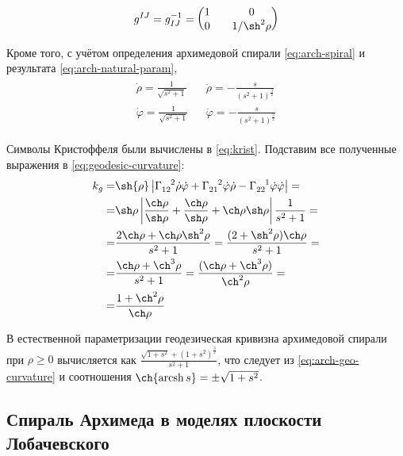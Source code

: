 \documentclass{article}
\numberwithin{equation}{section}
\renewcommand{\phi}{\varphi}
\newcommand{\krist}[3]{\Gamma^{\phantom{#1 #2}#3}_{#1 #2}}
\DeclareMathOperator{\arcsh}{arcsh}
\providecommand{\abs}[1]{\left \lvert{#1}\right \rvert}
\begin{document}
\begin{equation*}
  g^{IJ} = g_{IJ}^{-1} = \begin{pmatrix} 1 && 0 \\ 0 && 1/\sh^2{\rho} \end{pmatrix}
\end{equation*}

Кроме того, с учётом определения архимедовой спирали
\eqref{eq:arch-spiral} и результата \eqref{eq:arch-natural-param},
\begin{gather}
  \begin{align*}
    \dot{\rho} = \frac{1}{\sqrt{s^2+1}} && \ddot{\rho} = -\frac{s}{(s^2+1)^{\frac{3}{2}}}\\
    \dot{\phi} = \frac{1}{\sqrt{s^2+1}} && \ddot{\phi} = -\frac{s}{(s^2+1)^{\frac{3}{2}}}
  \end{align*}
\end{gather}

Символы Кристоффеля были вычислены в \eqref{eq:krist}. Подставим все
полученные выражения в \eqref{eq:geodesic-curvature}:
\begin{equation}\label{eq:arch-geo-curvature}
  \begin{split}
    k_g =& \sh{\rho} \abs{\krist{1}{2}{2} \dot{\rho} \dot{\phi} +
      \krist{2}{1}{2} \dot{\phi} \dot{\rho} - \krist{2}{2}{1} \dot{\phi}
      \dot {\phi}}= \\
    =& \sh\rho \abs{\frac{\ch\rho}{\sh\rho} +
      \frac{\ch\rho}{\sh\rho} + \ch\rho \sh\rho} \frac{1}{s^2+1} = \\
    =& \frac{2\ch\rho + \ch\rho \sh^2\rho}{s^2+1}
    = \frac{(2+\sh^2\rho)\ch\rho}{s^2+1} = \\
    =& \frac{\ch\rho + \ch^3\rho}{s^2+1} =
    \frac{(\ch\rho+\ch^3\rho)}{\ch^2\rho} = \\
    =& \frac{1 + \ch^2\rho}{\ch\rho}
  \end{split}
\end{equation}

В естественной параметризации геодезическая кривизна архимедовой
спирали при $\rho \geqslant 0$ вычисляется как $\frac{\sqrt{1+s^2} +
  (1+s^2)^{\frac{3}{2}}}{s^2+1}$, что следует из
\eqref{eq:arch-geo-curvature} и соотношения $\ch{\arcsh{s}} =
\pm\sqrt{1+s^2}$.

\clearpage
\subsection{Спираль Архимеда в моделях плоскости Лобачевского}
\end{document}
